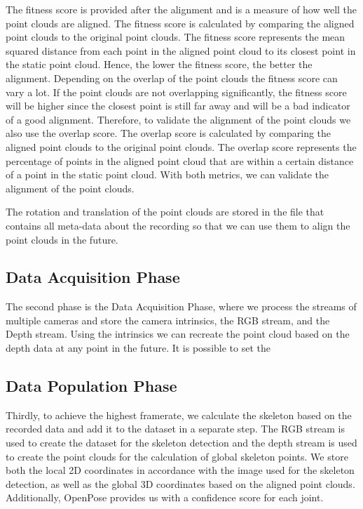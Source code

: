 The fitness score is provided after the alignment and is a measure of how well the point clouds are aligned. The fitness score is calculated by comparing the aligned point clouds to the original point clouds. The fitness score represents the mean squared distance from each point in the aligned point cloud to its closest point in the static point cloud. Hence, the lower the fitness score, the better the alignment. Depending on the overlap of the point clouds the fitness score can vary a lot. If the point clouds are not overlapping significantly, the fitness score will be higher since the closest point is still far away and will be a bad indicator of a good alignment. Therefore, to validate the alignment of the point clouds we also use the overlap score. The overlap score is calculated by comparing the aligned point clouds to the original point clouds. The overlap score represents the percentage of points in the aligned point cloud that are within a certain distance of a point in the static point cloud. With both metrics, we can validate the alignment of the point clouds.

The rotation and translation of the point clouds are stored in the file that contains all meta-data about the recording so that we can use them to align the point clouds in the future.

\subsection{Data Acquisition Phase}

The second phase is the Data Acquisition Phase, where we process the streams of multiple cameras and store the camera intrinsics, the RGB stream, and the Depth stream. Using the intrinsics we can recreate the point cloud based on the depth data at any point in the future. It is possible to set the 

\subsection{Data Population Phase}

Thirdly, to achieve the highest framerate, we calculate the skeleton based on the recorded data and add it to the dataset in a separate step. The RGB stream is used to create the dataset for the skeleton detection and the depth stream is used to create the point clouds for the calculation of global skeleton points. We store both the local 2D coordinates in accordance with the image used for the skeleton detection, as well as the global 3D coordinates based on the aligned point clouds. Additionally, OpenPose provides us with a confidence score for each joint.

